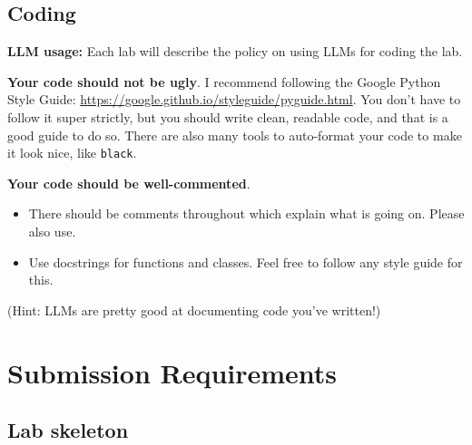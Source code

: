 \documentclass[letterpaper,12pt]{article}
\begin{document}
\subsection{Coding}

\textbf{LLM usage:} Each lab will describe the policy on using LLMs for coding the lab.

\textbf{Your code should not be ugly}. I recommend following the Google Python Style Guide: \url{https://google.github.io/styleguide/pyguide.html}. You don't have to follow it super strictly, but you should write clean, readable code, and that is a good guide to do so. There are also many tools to auto-format your code to make it look nice, like \texttt{black}.

\textbf{Your code should be well-commented}.
\begin{itemize}
  \item There should be comments throughout which explain what is going on. Please also use.
  \item Use docstrings for functions and classes. Feel free to follow any style guide for this.
\end{itemize}
(Hint: LLMs are pretty good at documenting code you've written!)


\section{Submission Requirements}

\subsection{Lab skeleton}
\end{document}
